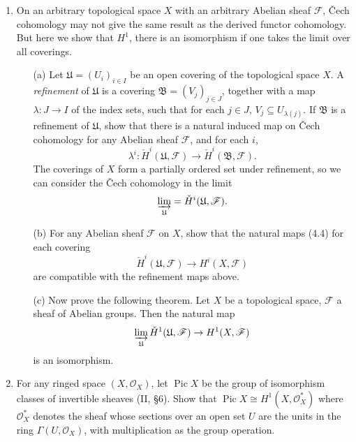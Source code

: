 \documentclass{article}
\newcommand{\goth}[1]{\mathfrak{#1}}
\newcommand{\fF}{\mathscr{F}}
\newcommand{\fO}{\mathscr{O}}
\DeclareMathOperator{\pic}{Pic}
\begin{document}
\begin{enumerate} [label=\textbf{\arabic*.}, leftmargin=0em]
\item On an arbitrary topological space $X$ with an arbitrary Abelian sheaf $\fF$, Čech cohomology may not give the same result as the derived functor cohomology.
But here we show that $H^1$, there is an isomorphism if one takes the limit over all coverings.
\begin{itemize}
  \item[(a)] Let $\goth{U} = (U_i)_{i \in I}$ be an open covering of the topological space $X$.
  A \textit{refinement} of $\goth{U}$ is a covering $\goth{B} = (V_j)_{j \in J}$, together with a map $\lambda : J \to I$ of the index sets, such that for each $j \in J$, $V_j \subseteq U_{\lambda(j)}$.
  If $\goth{B}$ is a refinement of $\goth{U}$, show that there is a natural induced map on Čech cohomology for any Abelian sheaf $\fF$, and for each $i$,
  \begin{equation*}
    \lambda^i : \check{H}^i(\goth{U}, \fF) \to \check{H}^i(\goth{B}, \fF).
  \end{equation*}
  The coverings of $X$ form a partially ordered set under refinement, so we can consider the Čech cohomology in the limit
  \begin{equation*}
    \varinjlim_\goth{U} = \check{H}^i(\goth{U}, \fF).
  \end{equation*}

  \item[(b)]  For any Abelian sheaf $\fF$ on $X$, show that the natural maps (4.4) for each covering
  \begin{equation*}
    \check{H}^i(\goth{U}, \fF) \to H^i(X, \fF)
  \end{equation*}
  are compatible with the refinement maps above.

  \item[(c)] Now prove the following theorem.
  Let $X$ be a topological space, $\fF$ a sheaf of Abelian groups.
  Then the natural map
  \begin{equation*}
    \varinjlim_\goth{U} \check{H}^1(\goth{U}, \fF) \to H^1(X, \fF)
  \end{equation*}
  is an isomorphism.
\end{itemize}

\item For any ringed space $(X, \fO_X)$, let $\pic{X}$ be the group of isomorphism classes of invertible sheaves (II, \S 6).
Show that $\pic{X} \cong H^1(X, \fO_X^*)$ where $\fO_X^*$ denotes the sheaf whose sections over an open set $U$ are the units in the ring $\Gamma(U, \fO_X)$, with multiplication as the group operation.

\end{enumerate}
\end{document}

